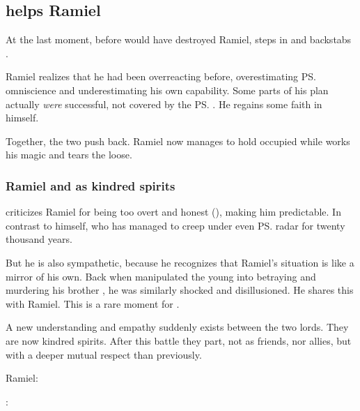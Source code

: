 \subsection{\Azraid helps Ramiel}
At the last moment, before \Daggerrain{} would have destroyed Ramiel, \Azraid{} steps in and backstabs \Daggerrain. 

Ramiel realizes that he had been overreacting before, overestimating \ps{\Daggerrain}{} omniscience and underestimating his own capability. 
Some parts of his plan actually \emph{were} successful, not covered by the \ps{\banelord}{} . 
He regains some faith in himself. 

Together, the two \satharioth{} push \Daggerrain{} back. 
Ramiel now manages to hold \Daggerrain{} occupied while \Azraid{} works his magic and tears the  loose. 





\subsubsection{Ramiel and \Azraid{} as kindred spirits}
\Azraid{} criticizes Ramiel for being too overt and honest (), making him predictable. 
In contrast to \Azraid{} himself, who has managed to creep under even \ps{\Daggerrain}{} radar for twenty thousand years. 

But he is also sympathetic, because he recognizes that Ramiel's situation is like a mirror of his own. 
Back when \Daggerrain{} manipulated the young \Azraid{} into betraying and murdering his brother \Damiarch, he was similarly shocked and disillusioned. 
He shares this with Ramiel. 
This is a rare  moment for \Azraid. 

A new understanding and empathy suddenly exists between the two \resphan{} lords. 
They are now kindred spirits. 
After this battle they part, not as friends, nor allies, but with a deeper mutual respect than previously. 

\begin{prose}
  Ramiel: 

  \Azraid: 
\end{prose}






